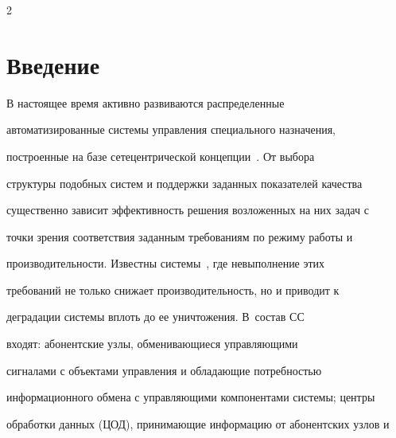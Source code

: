  












      \thispagestyle{headings}





      \begin{multicols}{2}





      \label{st\stat}


        


  \section{Введение}


  


  В настоящее время активно развиваются распределенные 


автоматизированные системы управ\-ле\-ния специального назначения, 


построенные на базе сетецентрической концепции~\cite{1bor}. От выбора 


структуры подобных систем и поддержки заданных показателей качества 


существенно зависит эффективность решения возложенных на них задач с 


точки зрения соответствия заданным требованиям по режиму работы и 


производительности. Известны системы~\cite{2bor}, где невыполнение этих 


требований не только снижает производительность, но и приводит к 


деградации системы вплоть до ее уничтожения. В~состав СС 


входят: абонентские узлы, обменивающиеся управляющими 


сигналами с объектами управления и обладающие потребностью 


информационного обмена с управляющими компонентами системы; центры 


обработки данных (ЦОД), при\-нимающие информацию от абонентских узлов и\linebreak 



\end{multicols}
